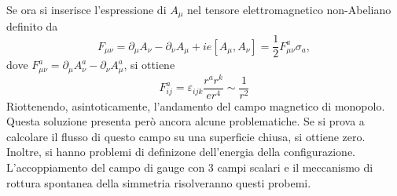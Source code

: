 Se ora si inserisce l'espressione di $A _\mu$ nel tensore elettromagnetico non-Abeliano
definito da
\begin{equation}
   F_{\mu\nu} = \partial _\mu A_\nu - \partial _\nu A _\mu + i e [A_\mu,A_\nu]
              = \frac{1}{2} F_{\mu\nu}^a \sigma _a ,
\end{equation}
dove $F_{\mu\nu}^a = \partial _\mu A_\nu^a - \partial _\nu A_\mu^a$, si ottiene
\begin{equation}
   F^a_{ij} = \varepsilon_{ijk} \frac{r^a r^k}{e r^4} \sim \frac{1}{r^2}
\end{equation}
Riottenendo, asintoticamente, l'andamento del campo magnetico di monopolo.\\

Questa soluzione presenta però ancora alcune problematiche. Se si prova a calcolare
il flusso di questo campo su una superficie chiusa, si ottiene zero. Inoltre, si
hanno problemi di definizone dell'energia della configurazione.\\

L'accoppiamento del campo di gauge con 3 campi scalari e il meccanismo di
rottura spontanea della simmetria risolveranno questi probemi.
